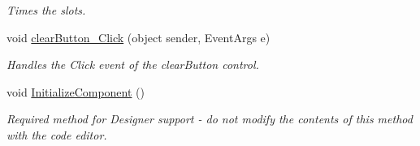 \begin{DoxyCompactItemize}
\begin{DoxyCompactList}\small\item\em Times the slots. \end{DoxyCompactList}\item 
void \hyperlink{classProject1_1_1AvailabilityForm_a8e5527c2a2732aa00b88e8099f181ac4}{clear\+Button\+\_\+\+Click} (object sender, Event\+Args e)
\begin{DoxyCompactList}\small\item\em Handles the Click event of the clear\+Button control. \end{DoxyCompactList}\item 
void \hyperlink{classProject1_1_1AvailabilityForm_af75b44f7bbfe72fcfbe25b41504eb52d}{Initialize\+Component} ()
\begin{DoxyCompactList}\small\item\em Required method for Designer support -\/ do not modify the contents of this method with the code editor. \end{DoxyCompactList}\end{DoxyCompactItemize}
